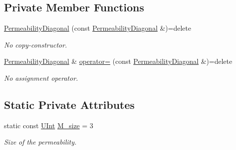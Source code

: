 \subsection*{Private Member Functions}
\begin{DoxyCompactItemize}
\item 
\hyperlink{classFVCode3D_1_1PermeabilityDiagonal_aae2f4a0242b40f463f86a878194cf799}{Permeability\+Diagonal} (const \hyperlink{classFVCode3D_1_1PermeabilityDiagonal}{Permeability\+Diagonal} \&)=delete
\begin{DoxyCompactList}\small\item\em No copy-\/constructor. \end{DoxyCompactList}\item 
\hyperlink{classFVCode3D_1_1PermeabilityDiagonal}{Permeability\+Diagonal} \& \hyperlink{classFVCode3D_1_1PermeabilityDiagonal_a7d9a69a1e9cfcdba8643de6c88dcb4e9}{operator=} (const \hyperlink{classFVCode3D_1_1PermeabilityDiagonal}{Permeability\+Diagonal} \&)=delete
\begin{DoxyCompactList}\small\item\em No assignment operator. \end{DoxyCompactList}\end{DoxyCompactItemize}
\subsection*{Static Private Attributes}
\begin{DoxyCompactItemize}
\item 
static const \hyperlink{namespaceFVCode3D_a4bf7e328c75d0fd504050d040ebe9eda}{U\+Int} \hyperlink{classFVCode3D_1_1PermeabilityDiagonal_a24f8f212517aec83cf08bf236a6b7444}{M\+\_\+size} = 3
\begin{DoxyCompactList}\small\item\em Size of the permeability. \end{DoxyCompactList}\end{DoxyCompactItemize}
